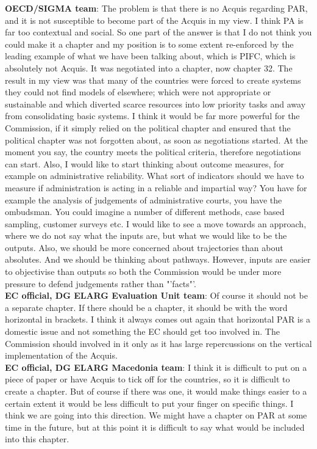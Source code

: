 \textbf{OECD/SIGMA team}: The problem is that there is no Acquis regarding PAR, and it is not susceptible to become part of the Acquis in my view. I think PA is far too contextual and social. So one part of the answer is that I do not think you could make it a chapter and my position is to some extent re-enforced by the leading example of what we have been talking about, which is PIFC, which is absolutely not Acquis. It was negotiated into a chapter, now chapter 32. The result in my view was that many of the countries were forced to create systems they could not find models of elsewhere; which were not appropriate or sustainable and which diverted scarce resources into low priority tasks and away from consolidating basic systems. I think it would be far more powerful for the Commission, if it simply relied on the political chapter and ensured that the political chapter was not forgotten about, as soon as negotiations started. At the moment you say, the country meets the political criteria, therefore negotiations can start. Also, I would like to start thinking about outcome measures, for example on administrative reliability. What sort of indicators should we have to measure if administration is acting in a reliable and impartial way? You have for example the analysis of judgements of administrative courts, you have the ombudsman. You could imagine a number of different methods, case based sampling, customer surveys etc. I would like to see a move towards an approach, where we do not say what the inputs are, but what we would like to be the outputs. Also, we should be more concerned about trajectories than about absolutes. And we should be thinking about pathways. However, inputs are easier to objectivise than outputs so both the Commission would be under more pressure to defend judgements rather than "'facts"'. \\
\textbf{EC official, DG ELARG Evaluation Unit team}: Of course it should not be a separate chapter. If there should be a chapter, it should be with the word horizontal in brackets. I think it always comes out again that horizontal PAR is a domestic issue and not something the EC should get too involved in. The Commission should involved in it only as it has large repercussions on the vertical implementation of the Acquis.  \\
\textbf{EC official, DG ELARG Macedonia team}: I think it is difficult to put on a piece of paper or have Acquis to tick off for the countries, so it is difficult to create a chapter. But of course if there was one, it would make things easier to a certain extent it would be less difficult to put your finger on specific things. I think we are going into this direction. We might have a chapter on PAR at some time in the future, but at this point it is difficult to say what would be included into this chapter. \\
